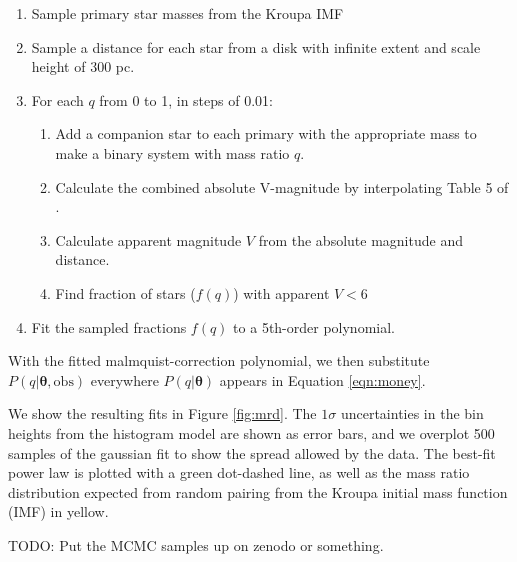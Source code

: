 \documentclass{emulateapj}
\renewcommand{\vec}[1]{\bm{#1}}
\begin{document}
\begin{enumerate}
\item Sample primary star masses from the Kroupa IMF \citep{Kroupa2002}
\item Sample a distance for each star from a disk with infinite extent and scale height of $300$ pc. 
\item For each $q$ from 0 to 1, in steps of 0.01:
\begin{enumerate}
  \item Add a companion star to each primary with the appropriate mass to make a binary system with mass ratio $q$.
  \item Calculate the combined absolute V-magnitude by interpolating Table 5 of \citet{Pecaut2013}.
  \item Calculate apparent magnitude $V$ from the absolute magnitude and distance.
  \item Find fraction of stars ($f(q)$) with apparent $V < 6$
\end{enumerate}
\item Fit the sampled fractions $f(q)$ to a 5th-order polynomial.
\end{enumerate}

With the fitted malmquist-correction polynomial, we then substitute $P(q|\vec{\theta}, \mathrm{obs})$ everywhere $P(q|\vec{\theta})$ appears in Equation \ref{eqn:money}.

We show the resulting fits in Figure \ref{fig:mrd}. The $1\sigma$ uncertainties in the bin heights from the histogram model are shown as error bars, and we overplot 500 samples of the gaussian fit to show the spread allowed by the data. The best-fit power law is plotted with a green dot-dashed line, as well as the mass ratio distribution expected from random pairing from the Kroupa initial mass function (IMF) in yellow.

TODO: Put the MCMC samples up on zenodo or something.
\end{document}
